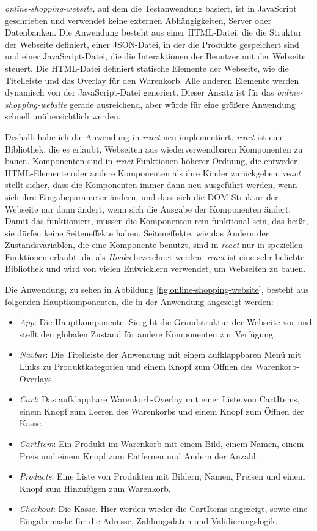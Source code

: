 \textit{online-shopping-website}, auf dem die Testanwendung basiert, ist in JavaScript geschrieben und verwendet keine externen Abhängigkeiten, Server oder Datenbanken.
Die Anwendung besteht aus einer HTML-Datei, die die Struktur der Webseite definiert, einer JSON-Datei, in der die Produkte gespeichert sind und einer JavaScript-Datei, die die Interaktionen der Benutzer mit der Webseite steuert.
Die HTML-Datei definiert statische Elemente der Webseite, wie die Titelleiste und das Overlay für den Warenkorb.
Alle anderen Elemente werden dynamisch von der JavaScript-Datei generiert.
Dieser Ansatz ist für das \textit{online-shopping-website} gerade ausreichend, aber würde für eine größere Anwendung schnell unübersichtlich werden.

Deshalb habe ich die Anwendung in \textit{react} neu implementiert.
\textit{react} ist eine Bibliothek, die es erlaubt, Webseiten aus wiederverwendbaren Komponenten zu bauen.
Komponenten sind in \textit{react} Funktionen höherer Ordnung, die entweder HTML-Elemente oder andere Komponenten als ihre Kinder zurückgeben.
\textit{react} stellt sicher, dass die Komponenten immer dann neu ausgeführt werden, wenn sich ihre Eingabeparameter ändern, und dass sich die DOM-Struktur der Webseite nur dann ändert, wenn sich die Ausgabe der Komponenten ändert.
Damit das funktioniert, müssen die Komponenten rein funktional sein, das heißt, sie dürfen keine Seiteneffekte haben.
Seiteneffekte, wie das Ändern der Zustandsvariablen, die eine Komponente benutzt, sind in \textit{react} nur in speziellen Funktionen erlaubt, die als \textit{Hooks} bezeichnet werden.
\textit{react} ist eine sehr beliebte Bibliothek und wird von vielen Entwicklern verwendet, um Webseiten zu bauen.

Die Anwendung, zu sehen in Abbildung \ref{fig:online-shopping-website}, besteht aus folgenden Hauptkomponenten, die in der Anwendung angezeigt werden:
\begin{itemize}
    \item \textit{App}: Die Hauptkomponente. Sie gibt die Grundstruktur der Webseite vor und stellt den globalen Zustand für andere Komponenten zur Verfügung.
    \item \textit{Navbar}: Die Titelleiste der Anwendung mit einem aufklappbaren Menü mit Links zu Produktkategorien und einem Knopf zum Öffnen des Warenkorb-Overlays.
    \item \textit{Cart}: Das aufklappbare Warenkorb-Overlay mit einer Liste von CartItems, einem Knopf zum Leeren des Warenkorbs und einem Knopf zum Öffnen der Kasse.
    \item \textit{CartItem}: Ein Produkt im Warenkorb mit einem Bild, einem Namen, einem Preis und einem Knopf zum Entfernen und Ändern der Anzahl.
    \item \textit{Products}: Eine Liste von Produkten mit Bildern, Namen, Preisen und einem Knopf zum Hinzufügen zum Warenkorb.
    \item \textit{Checkout}: Die Kasse. Hier werden wieder die CartItems angezeigt, sowie eine Eingabemaske für die Adresse, Zahlungsdaten und Validierungslogik.
\end{itemize}

